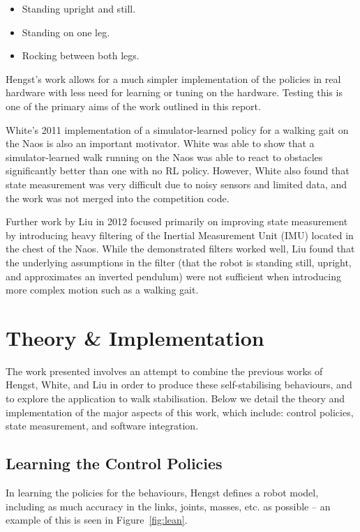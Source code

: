 \begin{itemize}
\item Standing upright and still.
\item Standing on one leg.
\item Rocking between both legs.
\end{itemize}

Hengst's work allows for a much simpler implementation of the policies in real hardware with less need for learning or tuning on the hardware. Testing this is one of the primary aims of the work outlined in this report.

White's\cite{white} 2011 implementation of a simulator-learned policy for a walking gait on the Naos is also an important motivator. White was able to show that a simulator-learned walk running on the Naos was able to react to obstacles significantly better than one with no RL policy. However, White also found that state measurement was very difficult due to noisy sensors and limited data, and the work was not merged into the competition code.

Further work by Liu\cite{liu} in 2012 focused primarily on improving state measurement by introducing heavy filtering of the Inertial Measurement Unit (IMU) located in the chest of the Naos. While the demonstrated filters worked well, Liu found that the underlying assumptions in the filter (that the robot is standing still, upright, and approximates an inverted pendulum) were not sufficient when introducing more complex motion such as a walking gait.

\section{Theory \& Implementation}

The work presented involves an attempt to combine the previous works of Hengst, White, and Liu in order to produce these self-stabilising behaviours, and to explore the application to walk stabilisation. Below we detail the theory and implementation of the major aspects of this work, which include: control policies, state measurement, and software integration.

\subsection{Learning the Control Policies}
\label{sec:learning_policies}
In learning the policies for the behaviours, Hengst\cite{bernhard_rl} defines a robot model, including as much accuracy in the links, joints, masses, etc. as possible -- an example of this is seen in Figure~\ref{fig:lean}.

